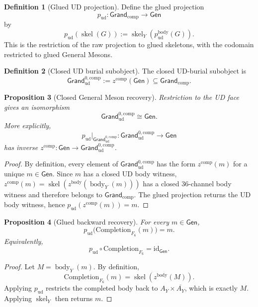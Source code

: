 \documentclass[11pt]{article}
\theoremstyle{definition}
\newtheorem{definition}{Definition}
\theoremstyle{plain}
\newtheorem{proposition}[definition]{Proposition}
\DeclareMathOperator{\skel}{skel}
\DeclareMathOperator{\body}{body}
\newcommand{\qu}{\mathrm u}
\newcommand{\qd}{\mathrm d}
\begin{document}
\begin{definition}[Glued UD projection]
Define the glued projection
\[
  p_{\qu\qd}:\mathsf{Grand}_{\mathrm{comp}}\to\mathsf{Gen}
\]
by
\[
  p_{\qu\qd}(\skel(G))
  :=
  \skel_Y\!\left(p^{\mathrm{body}}_{\qu\qd}(G)\right).
\]
This is the restriction of the raw projection to glued skeletons, with the
codomain restricted to glued General Mesons.
\end{definition}

\begin{definition}[Closed UD burial subobject]
The closed UD-burial subobject is
\[
  \mathsf{Grand}_{\qu\qd}^{0,\mathrm{comp}}
  :=
  z^{\mathrm{comp}}(\mathsf{Gen})
  \subseteq
  \mathsf{Grand}_{\mathrm{comp}}.
\]
\end{definition}

\begin{proposition}[Closed General Meson recovery]
Restriction to the UD face gives an isomorphism
\[
  \mathsf{Grand}_{\qu\qd}^{0,\mathrm{comp}}\cong\mathsf{Gen}.
\]
More explicitly,
\[
  p_{\qu\qd}|_{\mathsf{Grand}_{\qu\qd}^{0,\mathrm{comp}}}
  :
  \mathsf{Grand}_{\qu\qd}^{0,\mathrm{comp}}\to\mathsf{Gen}
\]
has inverse \(z^{\mathrm{comp}}:\mathsf{Gen}\to
\mathsf{Grand}_{\qu\qd}^{0,\mathrm{comp}}\).
\end{proposition}

\begin{proof}
By definition, every element of
\(\mathsf{Grand}_{\qu\qd}^{0,\mathrm{comp}}\) has the form \(z^{\mathrm{comp}}(m)\) for a
unique \(m\in\mathsf{Gen}\).  Since \(m\) has a closed UD body witness,
\(z^{\mathrm{comp}}(m)=\skel(z^{\mathrm{body}}(\body_Y(m)))\) has a closed
\(36\)-channel body witness and therefore belongs to
\(\mathsf{Grand}_{\mathrm{comp}}\).  The glued projection returns the UD
body witness, hence \(p_{\qu\qd}(z^{\mathrm{comp}}(m))=m\).
\end{proof}

\begin{proposition}[Glued backward recovery]
For every \(m\in\mathsf{Gen}\),
\[
  p_{\qu\qd}\bigl(\mathrm{Completion}_{F_6}(m)\bigr)=m.
\]
Equivalently,
\[
  p_{\qu\qd}\circ\mathrm{Completion}_{F_6}
  =
  \mathrm{id}_{\mathsf{Gen}}.
\]
\end{proposition}

\begin{proof}
Let \(M=\body_Y(m)\).  By definition,
\[
  \mathrm{Completion}_{F_6}(m)=\skel(z^{\mathrm{body}}(M)).
\]
Applying \(p_{\qu\qd}\) restricts the completed body back to
\(A_Y\times\overline{A_Y}\), which is exactly \(M\).  Applying
\(\skel_Y\) then returns \(m\).
\end{proof}
\end{document}
